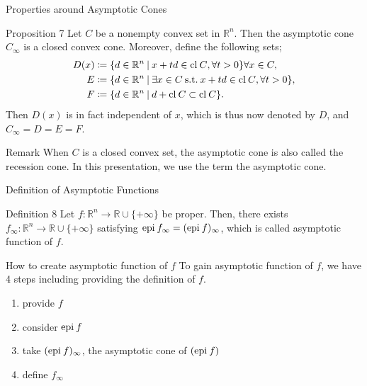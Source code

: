 \documentclass[aspectratio=169, dvipdfmx, 11pt]{beamer} %
\newcommand{\RealNumberSet}{\mathbb{R}}
\newcommand{\NDemenstionalRealEuclideanSpace}{\mathbb{R}^n}
\newcommand{\Closure}[1]{\text{\rm cl\:${#1}$}} %
\newcommand{\Epigraph}[1]{\text{\rm epi\:${#1}$}} %
\newcommand{\SuchThat}{\:\text{s.t.}\:}
\newcommand{\SetForm}[2]{
  \{{#1}\:|\:{#2}\}
}
\begin{document}
\begin{frame}{Properties around Asymptotic Cones}
  \begin{block}{Proposition 7}
    Let $C$ be a nonempty convex set in $\NDemenstionalRealEuclideanSpace$. Then the asymptotic cone $C_{\infty}$ is a closed convex cone. Moreover, define the following sets;
    \begin{align}
      D(x) &\coloneqq \SetForm{d \in \NDemenstionalRealEuclideanSpace}{x+td \in \Closure{C}, \forall t > 0} \forall x \in C, \notag \\
      E &\coloneqq \SetForm{d \in \NDemenstionalRealEuclideanSpace}{\exists x \in C \SuchThat x+td \in \Closure{C}, \forall t > 0}, \notag \\
      F &\coloneqq \SetForm{d \in \NDemenstionalRealEuclideanSpace}{d + \Closure{C} \subset \Closure{C}}. \notag
    \end{align}
    Then $D(x)$ is in fact independent of $x$, which is thus now denoted by $D$, and $C_{\infty} = D = E = F$.
  \end{block}

  \begin{alertblock}{Remark}
    When $C$ is a closed convex set, the asymptotic cone is also called the recession cone. In this presentation, we use the term the asymptotic cone.
  \end{alertblock}
\end{frame}

\begin{frame}{Definition of Asymptotic Functions}
  \begin{block}{Definition 8}
    Let $f: \NDemenstionalRealEuclideanSpace \rightarrow \RealNumberSet \cup \{+\infty\}$ be proper. Then, there exists $f_{\infty}: \NDemenstionalRealEuclideanSpace \rightarrow \RealNumberSet \cup \{+\infty\}$ satisfying $\Epigraph{f_{\infty}} = (\Epigraph{f})_{\infty}$, which is called asymptotic function of $f$.
  \end{block}

  \pause
  \begin{exampleblock}{How to create asymptotic function of $f$}
    To gain asymptotic function of $f$, we have 4 steps including providing the definition of $f$.
    \begin{enumerate}
      \item provide $f$
      \item consider $\Epigraph{f}$
      \item take $(\Epigraph{f})_{\infty}$, the asymptotic cone of $(\Epigraph{f})$
      \item define $f_{\infty}$
    \end{enumerate}
  \end{exampleblock}
\end{frame}
\end{document}
